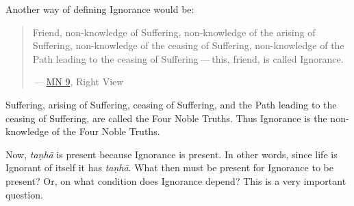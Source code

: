 Another way of defining Ignorance would be:

\begin{quote}
Friend, non-knowledge of Suffering, non-knowledge of the arising of Suffering, non-knowledge of the ceasing of Suffering, non-knowledge of the Path leading to the ceasing of Suffering --- this, friend, is called Ignorance.

 --- \href{https://suttacentral.net/mn9/en/bodhi}{MN 9}, Right View
\end{quote}

Suffering, arising of Suffering, ceasing of Suffering, and the Path leading to the ceasing of Suffering, are called the Four Noble Truths. Thus Ignorance is the non-knowledge of the Four Noble Truths.

Now, \emph{taṇhā} is present because Ignorance is present. In other words, since life is Ignorant of itself it has \emph{taṇhā}. What then must be present for Ignorance to be present? Or, on what condition does Ignorance depend? This is a very important question.

